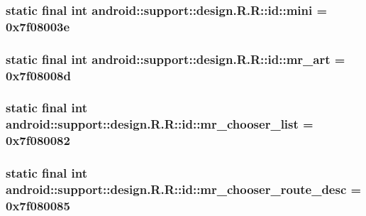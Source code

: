 \hypertarget{classandroid_1_1support_1_1design_1_1_r_1_1id_59953a6de4175fbdc12524898ac1e2cf}{
\subsubsection[{mini}]{\setlength{\rightskip}{0pt plus 5cm}static final int android::support::design.R.R::id::mini = 0x7f08003e}}
\label{classandroid_1_1support_1_1design_1_1_r_1_1id_59953a6de4175fbdc12524898ac1e2cf}


\hypertarget{classandroid_1_1support_1_1design_1_1_r_1_1id_d06a5deba7911b45c8c965d9a5fff912}{
\subsubsection[{mr\_\-art}]{\setlength{\rightskip}{0pt plus 5cm}static final int android::support::design.R.R::id::mr\_\-art = 0x7f08008d}}
\label{classandroid_1_1support_1_1design_1_1_r_1_1id_d06a5deba7911b45c8c965d9a5fff912}


\hypertarget{classandroid_1_1support_1_1design_1_1_r_1_1id_5648477a848da076322e4a3b6a271f61}{
\subsubsection[{mr\_\-chooser\_\-list}]{\setlength{\rightskip}{0pt plus 5cm}static final int android::support::design.R.R::id::mr\_\-chooser\_\-list = 0x7f080082}}
\label{classandroid_1_1support_1_1design_1_1_r_1_1id_5648477a848da076322e4a3b6a271f61}


\hypertarget{classandroid_1_1support_1_1design_1_1_r_1_1id_c022e3ff7ea568fccbb10d951d88596e}{
\subsubsection[{mr\_\-chooser\_\-route\_\-desc}]{\setlength{\rightskip}{0pt plus 5cm}static final int android::support::design.R.R::id::mr\_\-chooser\_\-route\_\-desc = 0x7f080085}}
\label{classandroid_1_1support_1_1design_1_1_r_1_1id_c022e3ff7ea568fccbb10d951d88596e}


